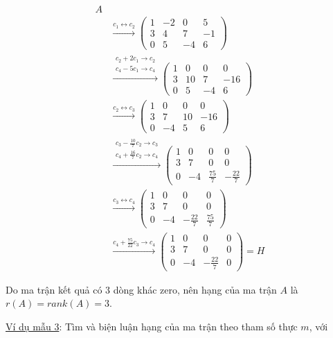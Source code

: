 \documentclass[12pt,a4paper]{article} \usepackage[utf8]{inputenc} \usepackage[T5]{fontenc} \usepackage[vietnamese]{babel} \usepackage{amsmath, amssymb, amsfonts} \usepackage{ulem}
\begin{document}
\begin{align*}
A \\
&\xrightarrow{c_1 \leftrightarrow c_2} \begin{pmatrix} 1 & -2 & 0 & 5 \\ 3 & 4 & 7 & -1 \\ 0 & 5 & -4 & 6 \end{pmatrix} \\
&\xrightarrow{\substack{c_2 + 2c_1 \to c_2 \\ c_4 - 5c_1 \to c_4} } \begin{pmatrix} 1 & 0 & 0 & 0 \\ 3 & 10 & 7 & -16 \\ 0 & 5 & -4 & 6 \end{pmatrix} \\
&\xrightarrow{c_2 \leftrightarrow c_3} \begin{pmatrix} 1 & 0 & 0 & 0 \\ 3 & 7 & 10 & -16 \\ 0 & -4 & 5 & 6 \end{pmatrix} \\
&\xrightarrow{\substack{c_3 - \frac{10}{7}c_2 \to c_3 \\ c_4 + \frac{16}{7}c_2 \to c_4}} \begin{pmatrix} 1 & 0 & 0 & 0 \\ 3 & 7 & 0 & 0 \\ 0 & -4 & \frac{75}{7} & -\frac{22}{7} \end{pmatrix} \\
&\xrightarrow{c_3 \leftrightarrow c_4} \begin{pmatrix} 1 & 0 & 0 & 0 \\ 3 & 7 & 0 & 0 \\ 0 & -4 & -\frac{22}{7} & \frac{75}{7} \end{pmatrix} \\
&\xrightarrow{c_4 + \frac{75} {22}c_3 \to c_4} \begin{pmatrix} 1 & 0 & 0 & 0 \\ 3 & 7 & 0 & 0 \\ 0 & -4 & -\frac{22}{7} & 0 \end{pmatrix} = H
\end{align*}

Do ma trận kết quả có 3 dòng khác zero, nên hạng của ma trận $A$ là $r(A) = rank(A) = 3$.

\ul{Ví dụ mẫu 3}: Tìm và biện luận hạng của ma trận theo tham số thực
$m$, với
\end{document}
